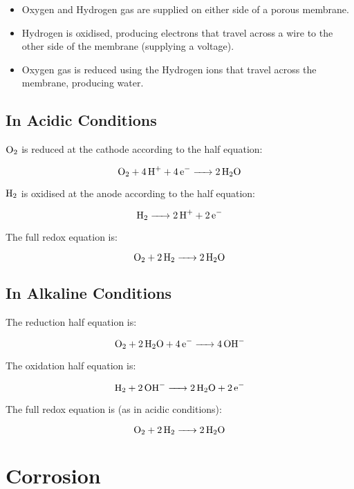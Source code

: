 \documentclass[a4paper,11pt]{article}
\begin{document}
\begin{itemize}
\item Oxygen and Hydrogen gas are supplied on either side of a porous membrane.
\item Hydrogen is oxidised, producing electrons that travel across a wire to the
	other side of the membrane (supplying a voltage).
\item Oxygen gas is reduced using the Hydrogen ions that travel across the
	membrane, producing water.
\end{itemize}

\subsection{In Acidic Conditions}

$\ce{O2}$ is reduced at the cathode according to the half equation:

$$
\ce{O2 + 4H+ + 4e- -> 2H2O}
$$

$\ce{H2}$ is oxidised at the anode according to the half equation:

$$
\ce{H2 -> 2H+ + 2e-}
$$

The full redox equation is:

$$
\ce{O2 + 2H2 -> 2H2O}
$$

\subsection{In Alkaline Conditions}

The reduction half equation is:

$$
\ce{O2 + 2H2O + 4e- -> 4OH-}
$$

The oxidation half equation is:

$$
\ce{H2 + 2OH- -> 2H2O + 2e-}
$$

The full redox equation is (as in acidic conditions):

$$
\ce{O2 + 2H2 -> 2H2O}
$$



\section{Corrosion}
\end{document}
